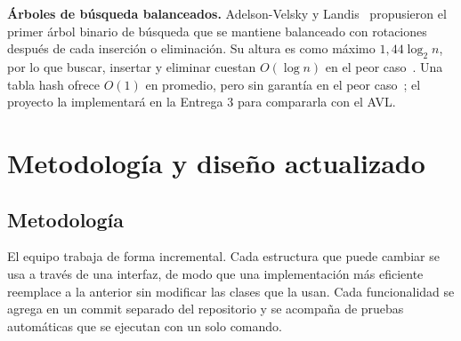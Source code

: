 \documentclass[conference]{IEEEtran}
\begin{document}
\textbf{Árboles de búsqueda balanceados.} Adelson-Velsky y Landis~\cite{avl1962} propusieron el primer árbol binario de búsqueda que se mantiene balanceado con rotaciones después de cada inserción o eliminación. Su altura es como máximo $1{,}44 \log_2 n$, por lo que buscar, insertar y eliminar cuestan $O(\log n)$ en el peor caso~\cite{goodrich}. Una tabla hash ofrece $O(1)$ en promedio, pero sin garantía en el peor caso~\cite{cormen}; el proyecto la implementará en la Entrega 3 para compararla con el AVL.


\section{Metodología y diseño actualizado}

\subsection{Metodología}
El equipo trabaja de forma incremental. Cada estructura que puede cambiar se usa a través de una interfaz, de modo que una implementación más eficiente reemplace a la anterior sin modificar las clases que la usan. Cada funcionalidad se agrega en un commit separado del repositorio y se acompaña de pruebas automáticas que se ejecutan con un solo comando.
\end{document}
